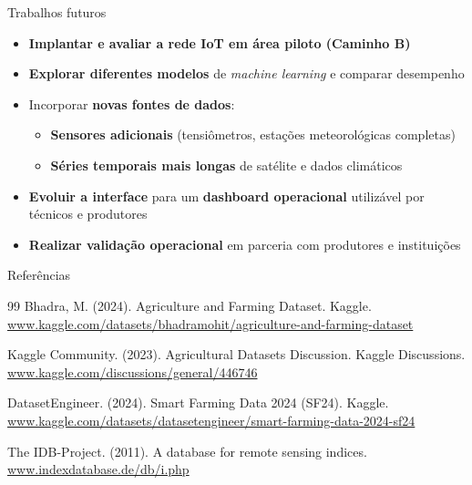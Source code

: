 \documentclass[aspectratio=169]{beamer}
\begin{document}
\begin{frame}{Trabalhos futuros}
  \begin{itemize}
    \item \textbf{Implantar e avaliar a rede IoT em área piloto (Caminho B)}
    \item \textbf{Explorar diferentes modelos} de \emph{machine learning} e comparar desempenho
    \item Incorporar \textbf{novas fontes de dados}:
      \begin{itemize}
        \item \textbf{Sensores adicionais} (tensiômetros, estações meteorológicas completas)
        \item \textbf{Séries temporais mais longas} de satélite e dados climáticos
      \end{itemize}
    \item \textbf{Evoluir a interface} para um \textbf{dashboard operacional} utilizável por técnicos e produtores
    \item \textbf{Realizar validação operacional} em parceria com produtores e instituições
  \end{itemize}
\end{frame}

\begin{frame}{Referências}
  \begin{thebibliography}{99}
     Bhadra, M. (2024). Agriculture and Farming Dataset. Kaggle. 
    \url{www.kaggle.com/datasets/bhadramohit/agriculture-and-farming-dataset}
    
     Kaggle Community. (2023). Agricultural Datasets Discussion. Kaggle Discussions.
    \url{www.kaggle.com/discussions/general/446746}
    
     DatasetEngineer. (2024). Smart Farming Data 2024 (SF24). Kaggle.
    \url{www.kaggle.com/datasets/datasetengineer/smart-farming-data-2024-sf24}

     The IDB-Project. (2011). A database for remote sensing indices.
    \url{www.indexdatabase.de/db/i.php}
  \end{thebibliography}
\end{frame}
\end{document}
